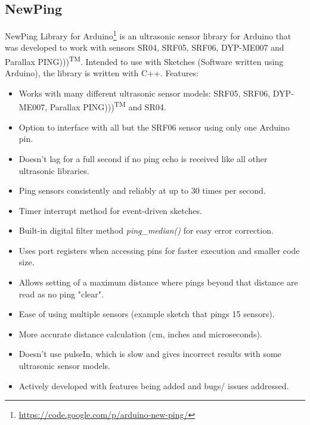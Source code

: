 \documentclass{acm_proc_article-sp}
\begin{document}
\subsection{NewPing}
NewPing Library for Arduino\footnote{\url{https://code.google.com/p/arduino-new-ping/}}  is an ultrasonic sensor library for Arduino that was developed to work with sensors SR04, SRF05, SRF06, DYP-ME007 and Parallax PING)))\textsuperscript{TM}. Intended to use with Sketches (Software written using Arduino), the library is written with C++.
\newline
\newline
Features:
\begin{itemize}
\item Works with many different ultrasonic sensor models: SRF05, SRF06, DYP-ME007, Parallax PING)))\textsuperscript{TM} and SR04.
\item Option to interface with all but the SRF06 sensor using only one Arduino pin.
\item Doesn't lag for a full second if no ping echo is received like all other ultrasonic libraries.
\item Ping sensors consistently and reliably at up to 30 times per second.
\item Timer interrupt method for event-driven sketches.
\item Built-in digital filter method \textit{ping\_median()} for easy error correction.
\item Uses port registers when accessing pins for faster execution and smaller code size.
\item Allows setting of a maximum distance where pings beyond that distance are read as no ping "clear".
\item Ease of using multiple sensors (example sketch that pings 15 sensors).
\item More accurate distance calculation (cm, inches and microseconds).
\item Doesn't use pulseIn, which is slow and gives incorrect results with some ultrasonic sensor models.
\item Actively developed with features being added and bugs/ issues addressed. 
\end{itemize}

\end{document}
